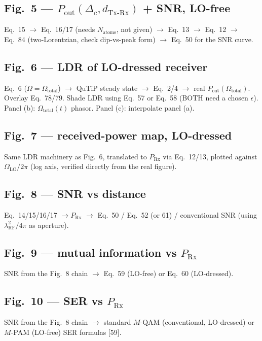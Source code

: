 \documentclass[11pt]{article}
\begin{document}
\subsection*{Fig.~5 --- $P_\text{out}(\Delta_c,d_\text{Tx-Rx})$ + SNR, LO-free}
Eq.~15 $\to$ Eq.~16/17 (needs $N_\text{atoms}$, not given) $\to$ Eq.~13
$\to$ Eq.~12 $\to$ Eq.~84 (two-Lorentzian, check dip-vs-peak form) $\to$
Eq.~50 for the SNR curve.

\subsection*{Fig.~6 --- LDR of LO-dressed receiver}
Eq.~6 ($\Omega=\Omega_\text{total}$) $\to$ QuTiP steady state $\to$
Eq.~2/4 $\to$ real $P_\text{out}(\Omega_\text{total})$. Overlay Eq.~78/79.
Shade LDR using Eq.~57 or Eq.~58 (BOTH need a chosen $\epsilon$).
Panel (b): $\Omega_\text{total}(t)$ phasor. Panel (c): interpolate
panel (a).

\subsection*{Fig.~7 --- received-power map, LO-dressed}
Same LDR machinery as Fig.~6, translated to $P_\text{Rx}$ via
Eq.~12/13, plotted against $\Omega_\text{LO}/2\pi$ (log axis, verified
directly from the real figure).

\subsection*{Fig.~8 --- SNR vs distance}
Eq.~14/15/16/17 $\to P_\text{Rx}$ $\to$ Eq.~50 / Eq.~52 (or 61) /
conventional SNR (using $\lambda_\text{RF}^2/4\pi$ as aperture).

\subsection*{Fig.~9 --- mutual information vs $P_\text{Rx}$}
SNR from the Fig.~8 chain $\to$ Eq.~59 (LO-free) or Eq.~60 (LO-dressed).

\subsection*{Fig.~10 --- SER vs $P_\text{Rx}$}
SNR from the Fig.~8 chain $\to$ standard $M$-QAM (conventional,
LO-dressed) or $M$-PAM (LO-free) SER formulas [59].
\end{document}
